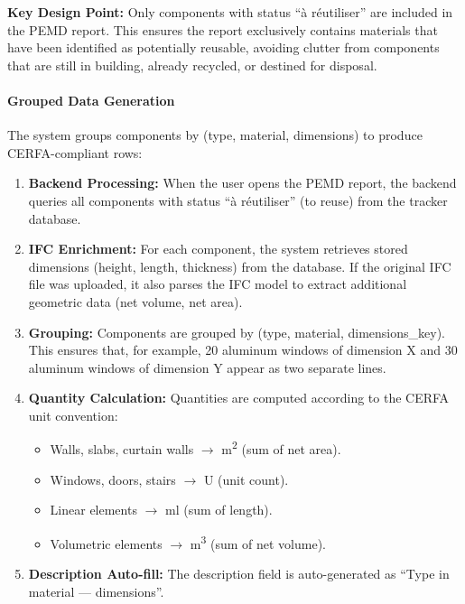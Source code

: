 \documentclass[11pt,a4paper]{article}
\begin{document}
\vspace{0.3cm}

\noindent\textbf{Key Design Point:} Only components with status ``à réutiliser'' are included in the PEMD report. This ensures the report exclusively contains materials that have been identified as potentially reusable, avoiding clutter from components that are still in building, already recycled, or destined for disposal.

\paragraph{Grouped Data Generation}

The system groups components by (type, material, dimensions) to produce CERFA-compliant rows:

\begin{enumerate}[leftmargin=*]
    \item \textbf{Backend Processing:} When the user opens the PEMD report, the backend queries all components with status ``à réutiliser'' (to reuse) from the tracker database.
    \item \textbf{IFC Enrichment:} For each component, the system retrieves stored dimensions (height, length, thickness) from the database. If the original IFC file was uploaded, it also parses the IFC model to extract additional geometric data (net volume, net area).
    \item \textbf{Grouping:} Components are grouped by (type, material, dimensions\_key). This ensures that, for example, 20 aluminum windows of dimension X and 30 aluminum windows of dimension Y appear as two separate lines.
    \item \textbf{Quantity Calculation:} Quantities are computed according to the CERFA unit convention:
        \begin{itemize}
            \item Walls, slabs, curtain walls $\rightarrow$ m\textsuperscript{2} (sum of net area).
            \item Windows, doors, stairs $\rightarrow$ U (unit count).
            \item Linear elements $\rightarrow$ ml (sum of length).
            \item Volumetric elements $\rightarrow$ m\textsuperscript{3} (sum of net volume).
        \end{itemize}
    \item \textbf{Description Auto-fill:} The description field is auto-generated as ``Type in material — dimensions''.
\end{enumerate}
\end{document}
